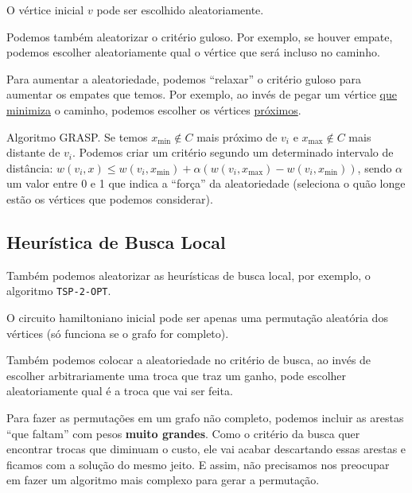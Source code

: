 O vértice inicial $v$ pode ser escolhido aleatoriamente.

Podemos também aleatorizar o critério guloso. Por exemplo, se houver empate, podemos escolher aleatoriamente qual o vértice que será incluso no caminho.

Para aumentar a aleatoriedade, podemos ``relaxar'' o critério guloso para aumentar os empates que temos. Por exemplo, ao invés de pegar um vértice \underline{que minimiza} o caminho, podemos escolher os vértices \underline{próximos}.

Algoritmo GRASP. Se temos $x_{\min} \notin C$ mais próximo de $v_i$ e $x_{\max} \notin C$ mais distante de $v_i$. Podemos criar um critério segundo um determinado intervalo de distância: $w(v_i, x) \leq w(v_i, x_{\min}) + \alpha \left( w(v_i, x_{\max}) - w(v_i, x_{\min}) \right)$, sendo $\alpha$ um valor entre 0 e 1 que indica a ``força'' da aleatoriedade (seleciona o quão longe estão os vértices que podemos considerar).

\subsection{Heurística de Busca Local}

Também podemos aleatorizar as heurísticas de busca local, por exemplo, o algoritmo \lstinline{TSP-2-OPT}.

O circuito hamiltoniano inicial pode ser apenas uma permutação aleatória dos vértices (só funciona se o grafo for completo).

Também podemos colocar a aleatoriedade no critério de busca, ao invés de escolher arbitrariamente uma troca que traz um ganho, pode escolher aleatoriamente qual é a troca que vai ser feita.

Para fazer as permutações em um grafo não completo, podemos incluir as arestas ``que faltam'' com pesos \textbf{muito grandes}. Como o critério da busca quer encontrar trocas que diminuam o custo, ele vai acabar descartando essas arestas e ficamos com a solução do mesmo jeito. E assim, não precisamos nos preocupar em fazer um algoritmo mais complexo para gerar a permutação.

